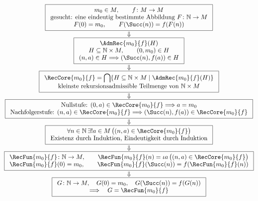\begingroup
\footnotesize
\[
\begin{array}{@{}c@{}}
\boxed{
\begin{array}{c}
m_0\in M,\qquad f\colon M\to M
\\[-.1ex]
\text{gesucht: eine eindeutig bestimmte Abbildung }
F\colon\mathbb{N}\to M
\\[-.1ex]
F(0)=m_0,\qquad F(\Succ(n))=f(F(n))
\end{array}}
\\[1.1ex]
\Downarrow
\\[-.2ex]
\boxed{
\begin{array}{c}
\AdmRec{m_0}{f}(H)
\\[-.1ex]
H\subseteq\mathbb{N}\times M,\qquad
(0,m_0)\in H
\\[-.1ex]
(n,a)\in H\Longrightarrow(\Succ(n),f(a))\in H
\end{array}}
\\[1.1ex]
\Downarrow
\\[-.2ex]
\boxed{
\begin{array}{c}
\RecCore{m_0}{f}
=
\displaystyle\bigcap\{H\subseteq\mathbb{N}\times M
\mid \AdmRec{m_0}{f}(H)\}
\\[-.1ex]
\text{kleinste rekursionsadmissible Teilmenge von }
\mathbb{N}\times M
\end{array}}
\\[1.1ex]
\Downarrow
\\[-.2ex]
\boxed{
\begin{array}{c}
\text{Nullstufe: }(0,a)\in\RecCore{m_0}{f}
\Longrightarrow a=m_0
\\[-.1ex]
\text{Nachfolgerstufe: }(n,a)\in\RecCore{m_0}{f}
\Longrightarrow
(\Succ(n),f(a))\in\RecCore{m_0}{f}
\end{array}}
\\[1.1ex]
\Downarrow
\\[-.2ex]
\boxed{
\begin{array}{c}
\forall n\in\mathbb{N}\,\exists!a\in M\,
\bigl((n,a)\in\RecCore{m_0}{f}\bigr)
\\[-.1ex]
\text{Existenz durch Induktion, Eindeutigkeit durch Induktion}
\end{array}}
\\[1.1ex]
\Downarrow
\\[-.2ex]
\boxed{
\begin{array}{c}
\RecFun{m_0}{f}\colon\mathbb{N}\to M,
\qquad
\RecFun{m_0}{f}(n)
=
\iota a\,\bigl((n,a)\in\RecCore{m_0}{f}\bigr)
\\[-.1ex]
\RecFun{m_0}{f}(0)=m_0,\qquad
\RecFun{m_0}{f}(\Succ(n))=f(\RecFun{m_0}{f}(n))
\end{array}}
\\[1.1ex]
\Downarrow
\\[-.2ex]
\boxed{
\begin{array}{c}
G\colon\mathbb{N}\to M,\quad
G(0)=m_0,\quad
G(\Succ(n))=f(G(n))
\\[-.1ex]
\Longrightarrow\quad
G=\RecFun{m_0}{f}
\end{array}}
\end{array}
\]
\endgroup

